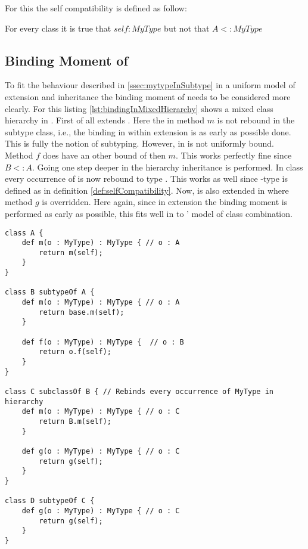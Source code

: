 For this the self compatibility is defined as follow:

\begin{defn}
	\label{def:selfCompatibility}
	For every class \A it is true that $self : MyType$ but not that $A <: MyType$
\end{defn}

\subsection{Binding Moment of \mytype}
To fit the behaviour described in \cref{ssec:mytypeInSubtype} in
a uniform model of extension and inheritance the binding moment
of \mytype needs to be considered more clearly. For this listing
\ref{lst:bindingInMixedHierarchy} shows a mixed class hierarchy in
\ooplss. First of all \B extends \A. Here the \mytype in method $m$ is
not rebound in the subtype class, i.e., the \mytype binding in within
extension is as early as possible done. This is fully the notion of
subtyping. However, in \B is \mytype not uniformly bound. Method $f$
does have an other bound of \mytype then $m$. This works perfectly fine
since $B <: A$. Going one step deeper in the hierarchy inheritance is
performed. In class \C every occurrence of \mytype is now rebound to
type \C. This works as well since \self-type is defined as in definition
\ref{def:selfCompatibility}. Now, \C is also extended in \D where method
$g$ is overridden. Here again, since in extension the binding moment is
performed as early as possible, this fits well in to \ooplss' model of
class combination.

\begin{lstlisting}[float,language=ooplss,caption=Binding of \self and \mytype in a mixed context,label=lst:bindingInMixedHierarchy]
class A {
	def m(o : MyType) : MyType { // o : A
		return m(self); 
	}
}

class B subtypeOf A {
	def m(o : MyType) : MyType { // o : A
		return base.m(self);
	}

	def f(o : MyType) : MyType {  // o : B
		return o.f(self); 
	}
}

class C subclassOf B { // Rebinds every occurrence of MyType in hierarchy
	def m(o : MyType) : MyType { // o : C
		return B.m(self);
	}

	def g(o : MyType) : MyType { // o : C
		return g(self);
	}
}

class D subtypeOf C {
	def g(o : MyType) : MyType { // o : C
		return g(self);
	}
}
\end{lstlisting}

